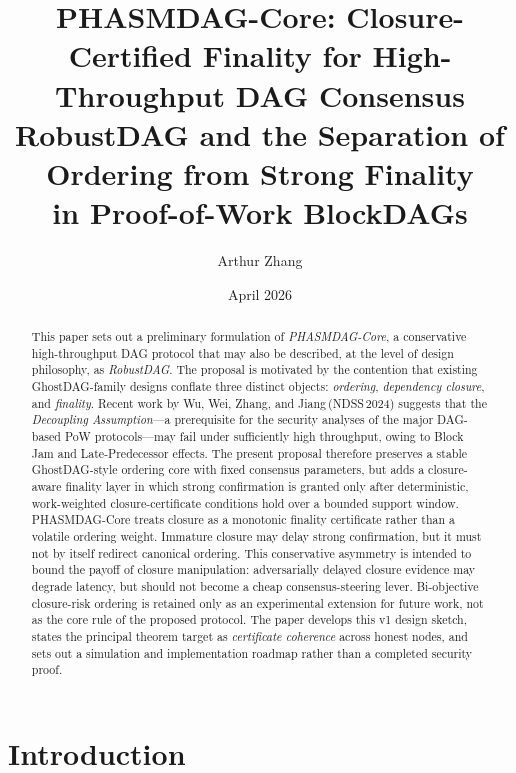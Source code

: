 \documentclass[11pt]{article}
\title{\textbf{PHASMDAG-Core: Closure-Certified Finality for High-Throughput DAG Consensus}\\[6pt]
{\large RobustDAG and the Separation of Ordering from Strong Finality\\
in Proof-of-Work BlockDAGs}}
\author{Arthur Zhang}
\date{April 2026}
\theoremstyle{definition}
\theoremstyle{plain}
\theoremstyle{remark}
\begin{document}
\maketitle

\begin{abstract}
This paper sets out a preliminary formulation of \emph{PHASMDAG-Core}, a
conservative high-throughput DAG protocol that may also be described, at the
level of design philosophy, as \emph{RobustDAG}.
The proposal is motivated by the contention that existing GhostDAG-family
designs conflate three distinct objects: \emph{ordering}, \emph{dependency
closure}, and \emph{finality}.
Recent work by Wu, Wei, Zhang, and Jiang\,(NDSS\,2024) suggests that the
\emph{Decoupling Assumption}---a prerequisite for the security analyses of the
major DAG-based PoW protocols---may fail under sufficiently high throughput,
owing to Block Jam and Late-Predecessor effects.
The present proposal therefore preserves a stable GhostDAG-style ordering core
with fixed consensus parameters, but adds a closure-aware finality layer in
which strong confirmation is granted only after deterministic,
work-weighted closure-certificate conditions hold over a bounded support
window.
PHASMDAG-Core treats closure as a monotonic finality certificate rather than a
volatile ordering weight.
Immature closure may delay strong confirmation, but it must not by itself
redirect canonical ordering.
This conservative asymmetry is intended to bound the payoff of closure
manipulation: adversarially delayed closure evidence may degrade latency, but
should not become a cheap consensus-steering lever.
Bi-objective closure-risk ordering is retained only as an experimental
extension for future work, not as the core rule of the proposed protocol.
The paper develops this v1 design sketch, states the principal theorem target
as \emph{certificate coherence} across honest nodes, and sets out a simulation
and implementation roadmap rather than a completed security proof.
\end{abstract}


\section{Introduction}\label{sec:intro}
\end{document}
